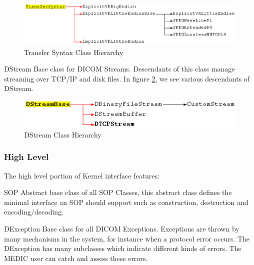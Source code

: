 \documentclass[a4paper,10pt]{article}
\begin{document}
\begin{figure}[htbp]
  \begin{center}
    \includegraphics[scale=0.85]{transfersyntax-classhierarchy.eps}
    \caption{Transfer Syntax Class Hierarchy}
    \label{fig:transfersyntax}
  \end{center}
\end{figure}

\begin{class}{DStream}
  Base class for DICOM Streams. Descendants of this class manage
  streaming over TCP/IP and disk files. In figure \ref{fig:dstream},
  we see various descendants of DStream.
\end{class}

\begin{figure}[htbp]
  \begin{center}
    \includegraphics[scale=1]{dstream-classhierarchy.eps}
    \caption{DStream Class Hierarchy}
    \label{fig:dstream}
  \end{center}
\end{figure}

\subsubsection{High Level}

The high level portion of Kernel interface features:

\begin{class}{SOP}
  Abstract base class of all SOP Classes, this abstract class defines the
  minimal interface an SOP should support such as construction, destruction
  and encoding/decoding.
\end{class}

\begin{class}{DException}
  Base class for all DICOM Exceptions. Exceptions are thrown by
  many mechanisms in the system, for instance when a protocol error occurs.
  The DException has many subclasses which indicate different kinds of errors.
  The MEDIC user can catch and assess these errors.
\end{class}
\end{document}
